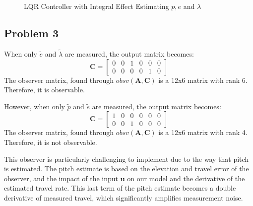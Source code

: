 \begin{figure}[p]
  \caption{LQR Controller with Integral Effect Estimating $p, e$ and $\lambda$}
  \label{fig:LQRIntegralEffect_Estimator}
\end{figure}
\restoregeometry

\subsection{Problem 3}

When only $\tilde{e}$ and $\tilde{\lambda}$ are measured, the output
matrix becomes:
%
\begin{equation*}
  \bm{C} =
  \begin{bmatrix}
    0 & 0 & 1 & 0 & 0 & 0 \\
    0 & 0 & 0 & 0 & 1 & 0
  \end{bmatrix}
\end{equation*}
%
The observer matrix, found through $obsv(\bm{A},\bm{C})$ is a 12x6
matrix with rank 6. Therefore, it is observable.

However, when only $\tilde{p}$ and $\tilde{e}$ are measured, the
output matrix becomes:
%
\begin{equation*}
  \bm{C} =
  \begin{bmatrix}
    1 & 0 & 0 & 0 & 0 & 0 \\
    0 & 0 & 1 & 0 & 0 & 0
  \end{bmatrix}
\end{equation*}
%
The observer matrix, found through $obsv(\bm{A},\bm{C})$ is a 12x6
matrix with rank 4. Therefore, it is not observable.

This observer is particularly challenging to implement due to the way that pitch is estimated.  The pitch estimate is based on the elevation and travel error of the observer, and the impact of the input $\bm{u}$ on our model and the derivative of the estimated travel rate.  This last term of the pitch estimate becomes a double derivative of measured travel, which significantly amplifies measurement noise.

